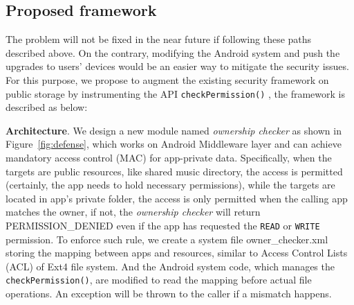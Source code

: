 \documentclass{sig-alternate}
\begin{document}
\begin{figure}[t]
\end{figure}


\subsection{Proposed framework}
The problem will not be fixed in the near future if following these paths described above. On the contrary, modifying the Android system and push the upgrades to users' devices would be an easier way to mitigate the security issues. For this purpose, we propose to augment the existing security framework on public storage by instrumenting the API \texttt{checkPermission()} \cite{checkPermission}, the framework is described as below:

\noindent\textbf{Architecture}. We design a new module named \textit{ownership checker} as shown in Figure~\ref{fig:defense}, which works on Android Middleware layer and can achieve mandatory access control (MAC) for app-private data. Specifically, when the targets are public resources, like shared music directory, the access is permitted (certainly, the app needs to hold necessary permissions), while the targets are located in app's private folder, the access is only permitted when the calling app matches the owner, if not, the  \textit{ownership checker} will return PERMISSION\_DENIED even if the app has requested the \texttt{READ} or \texttt{WRITE} permission. To enforce such rule, we create a system file owner\_checker.xml storing the mapping between apps and resources, similar to Access Control Lists (ACL) of Ext4 file system. And the Android system code, which manages the \texttt{checkPermission()}, are modified to read the mapping before actual file operations. An exception will be thrown to the caller if a mismatch happens.
\end{document}
